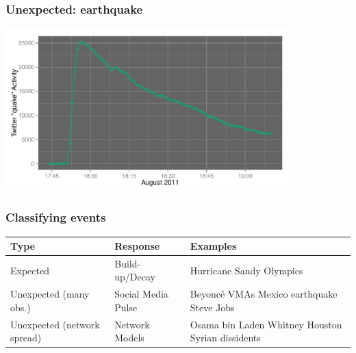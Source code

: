 \documentclass{beamer}
\begin{document}
\begin{frame}\frametitle{Unexpected: earthquake}
  \begin{center}
    \includegraphics[width=11cm]{./imgs/SMP_va_quake.pdf}
  \end{center}
\end{frame}

\begin{frame}\frametitle{Classifying events}
\begin{table}
\begin{tabular}{ m{2cm} | m{ 2.5cm} | m{4cm}}
\hline
Type & Response & Examples \\ \hline
Expected    &  Build-up/Decay & Hurricane Sandy \newline Olympics \\ \hline
Unexpected (many obs.) & Social Media \newline Pulse & Beyonc\'{e} VMAs \newline  Mexico earthquake \newline  Steve Jobs \\ \hline
Unexpected  (network spread) & Network \newline Models  & Osama bin Laden \newline  Whitney Houston \newline  Syrian dissidents \\ \hline
\end{tabular}
\end{table}
\end{frame}

\end{document}
